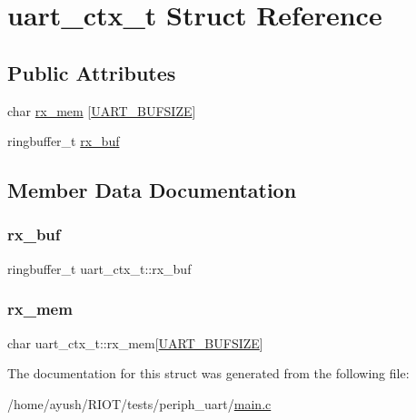 \hypertarget{structuart__ctx__t}{}\section{uart\+\_\+ctx\+\_\+t Struct Reference}
\label{structuart__ctx__t}
\subsection*{Public Attributes}
\begin{DoxyCompactItemize}
\item 
char \hyperlink{structuart__ctx__t_a2eeff1b1b69b7aedf4aa0d2209663904}{rx\+\_\+mem} \mbox{[}\hyperlink{periph__uart_2main_8c_adaf5112feae5d36c62df62ea7f987ac3}{U\+A\+R\+T\+\_\+\+B\+U\+F\+S\+I\+ZE}\mbox{]}
\item 
ringbuffer\+\_\+t \hyperlink{structuart__ctx__t_ac63e33043ec2b230e4a307c4e7631199}{rx\+\_\+buf}
\end{DoxyCompactItemize}


\subsection{Member Data Documentation}
\mbox{\label{structuart__ctx__t_ac63e33043ec2b230e4a307c4e7631199}} 
\subsubsection{\texorpdfstring{rx\+\_\+buf}{rx\_buf}}
{\footnotesize\ttfamily ringbuffer\+\_\+t uart\+\_\+ctx\+\_\+t\+::rx\+\_\+buf}

\mbox{\label{structuart__ctx__t_a2eeff1b1b69b7aedf4aa0d2209663904}} 
\subsubsection{\texorpdfstring{rx\+\_\+mem}{rx\_mem}}
{\footnotesize\ttfamily char uart\+\_\+ctx\+\_\+t\+::rx\+\_\+mem\mbox{[}\hyperlink{periph__uart_2main_8c_adaf5112feae5d36c62df62ea7f987ac3}{U\+A\+R\+T\+\_\+\+B\+U\+F\+S\+I\+ZE}\mbox{]}}



The documentation for this struct was generated from the following file\+:\begin{DoxyCompactItemize}
\item 
/home/ayush/\+R\+I\+O\+T/tests/periph\+\_\+uart/\hyperlink{periph__uart_2main_8c}{main.\+c}\end{DoxyCompactItemize}
